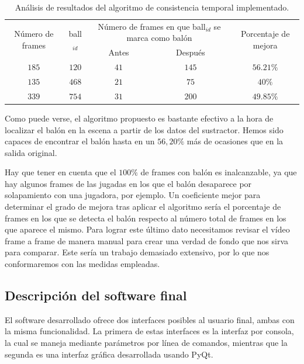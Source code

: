 \begin{table}
\centering
\begin{tabular}{|c|c|c|c|c|}
\hline
\multirow{2}{2cm}{Número de frames} & \multirow{2}{*}{ball$_{id}$} & \multicolumn{2}{m{4cm}|}{Número de frames en que ball$_{id}$ se marca como balón} & \multirow{2}{2cm}{Porcentaje de mejora} \\ \cline{3-4}
& & \multicolumn{1}{m{2cm}|}{Antes} & \multicolumn{1}{m{2cm}|}{Después} &  \\ \hline
 $185$ & $120$ & $41$ & $145$ & $56.21\%$ \\ \hline
 $135$ & $468$ & $21$ & $75$ & $40\%$ \\ \hline
 $339$ & $754$ & $31$ & $200$ & $49.85\%$ \\ \hline
\end{tabular}
\caption{Análisis de resultados del algoritmo de consistencia temporal implementado. }
\label{tab:3}
\end{table}

Como puede verse, el algoritmo propuesto es bastante efectivo a la hora de localizar el balón en la escena a partir de los datos del sustractor. Hemos sido capaces de encontrar el balón hasta en un $56,20\%$ más de ocasiones que en la salida original. 

Hay que tener en cuenta que el $100\%$ de frames con balón es inalcanzable, ya que hay algunos frames de las jugadas en los que el balón desaparece por solapamiento con una jugadora, por ejemplo. Un coeficiente mejor para determinar el grado de mejora tras aplicar el algoritmo sería el porcentaje de frames en los que se detecta el balón respecto al número total de frames en los que aparece el mismo. Para lograr este último dato necesitamos revisar el vídeo frame a frame de manera manual para crear una verdad de fondo que nos sirva para comparar. Este sería un trabajo demasiado extensivo, por lo que nos conformaremos con las medidas empleadas.


\subsection{Descripción del software final}

El software desarrollado ofrece dos interfaces posibles al usuario final, ambas con la misma funcionalidad. La primera de estas interfaces es la interfaz por consola, la cual se maneja mediante parámetros por línea de comandos, mientras que la segunda es una interfaz gráfica desarrollada usando PyQt.

